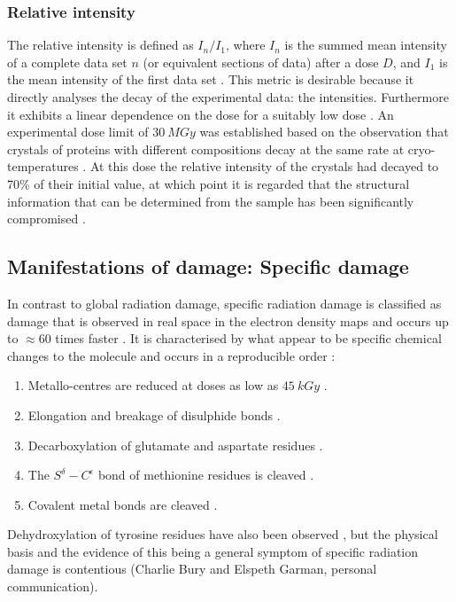         \subsubsection{Relative intensity}
        \label{subs:Relative intensity}
            The relative intensity is defined as $I_n/I_1$, where $I_n$ is the summed mean intensity of a complete data set $n$ (or equivalent sections of data) after a dose $D$, and $I_1$ is the mean intensity of the first data set \cite{garman2010}.
            This metric is desirable because it directly analyses the decay of the experimental data: the intensities. Furthermore it exhibits a linear dependence on the dose for a suitably low dose \cite{owen2006,zeldin2013dwd}.
            An experimental dose limit of $30\ MGy$ was established based on the observation that crystals of proteins with different compositions decay at the same rate at cryo-temperatures \cite{owen2006}.
            At this dose the relative intensity of the crystals had decayed to 70\% of their initial value, at which point it is regarded that the structural information that can be determined from the sample has been significantly compromised \cite{owen2006,blundell1976protein}.

    \subsection{Manifestations of damage: Specific damage}
    \label{sub:Manifestations of damage: Specific damage}
        In contrast to global radiation damage, specific radiation damage is classified as damage that is observed in real space in the electron density maps and occurs up to $\approx 60$ times faster \cite{holton2009}.
        It is characterised by what appear to be specific chemical changes to the molecule and occurs in a reproducible order \cite{ravelli2000,weik2000,gerstel2015identifying}:
        \begin{enumerate}
            \item Metallo-centres are reduced at doses as low as $45\ kGy$ \cite{owen2011revealing}.
            \item Elongation and breakage of disulphide bonds \cite{burmeister2000structural,ravelli2000}.
            \item Decarboxylation of glutamate and aspartate residues \cite{burmeister2000structural,weik2000,ravelli2000}.
            \item The $S^{\delta}-C^{\epsilon}$ bond of methionine residues is cleaved \cite{burmeister2000structural}.
            \item Covalent metal bonds are cleaved \cite{ramagopal2005radiation}.
        \end{enumerate}
        Dehydroxylation of tyrosine residues have also been observed \cite{burmeister2000structural}, but the physical basis and the evidence of this being a general symptom of specific radiation damage is contentious (Charlie Bury and Elspeth Garman, personal communication).
        
